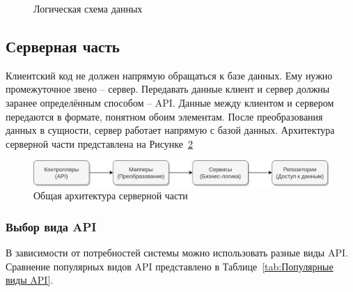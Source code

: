 \documentclass[a4paper,article]{article}
\begin{document}
\begin{sloppypar}
\begin{figure}[h]
        \caption{\centering Логическая схема данных}

        \label{fig:Логическая схема данных}

    \end{figure}

    \newpage

    \subsection{Серверная часть}

    Клиентский код не должен напрямую обращаться к базе данных. Ему нужно промежуточное звено -- сервер. Передавать данные клиент и сервер должны заранее определённым способом -- API. Данные между клиентом и сервером передаются в формате, понятном обоим элементам. После преобразования данных в сущности, сервер работает напрямую с базой данных. Архитектура серверной части представлена на Рисунке~\ref{fig:Архитектура серверной части}

    \begin{figure}[h]

        \centering

        \includegraphics[width=0.9\linewidth]{Архитектура серверной части.png}

        \caption{\centering Общая архитектура серверной части}

        \label{fig:Архитектура серверной части}

    \end{figure}

    \subsubsection{Выбор вида API}

    В зависимости от потребностей системы можно использовать разные виды API. Сравнение популярных видов API представлено в Таблице~\ref{tab:Популярные виды API}.


\end{sloppypar}
\end{document}
